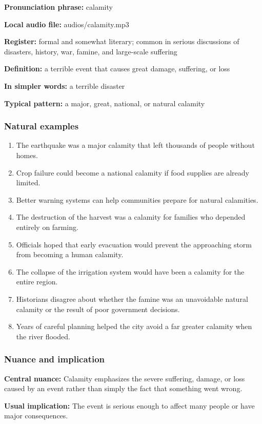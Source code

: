 \documentclass[11pt]{article}
\begin{document}
\textbf{Pronunciation phrase:} calamity

\textbf{Local audio file:} audios/calamity.mp3

\textbf{Register:} formal and somewhat literary; common in serious discussions of disasters, history, war, famine, and large-scale suffering

\textbf{Definition:} a terrible event that causes great damage, suffering, or loss

\textbf{In simpler words:} a terrible disaster

\textbf{Typical pattern:} a major, great, national, or natural calamity

\subsubsection{Natural examples}
\begin{enumerate}
  \item The earthquake was a major calamity that left thousands of people without homes.
  \item Crop failure could become a national calamity if food supplies are already limited.
  \item Better warning systems can help communities prepare for natural calamities.
  \item The destruction of the harvest was a calamity for families who depended entirely on farming.
  \item Officials hoped that early evacuation would prevent the approaching storm from becoming a human calamity.
  \item The collapse of the irrigation system would have been a calamity for the entire region.
  \item Historians disagree about whether the famine was an unavoidable natural calamity or the result of poor government decisions.
  \item Years of careful planning helped the city avoid a far greater calamity when the river flooded.
\end{enumerate}

\subsubsection{Nuance and implication}
\textbf{Central nuance:} Calamity emphasizes the severe suffering, damage, or loss caused by an event rather than simply the fact that something went wrong.

\textbf{Usual implication:} The event is serious enough to affect many people or have major consequences.
\end{document}
